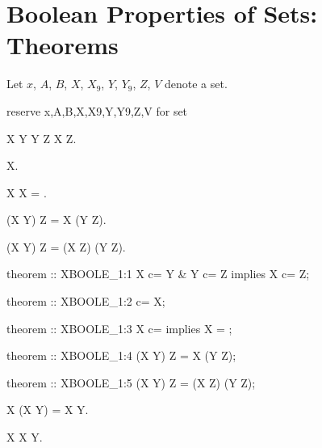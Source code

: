 \bigbreak
\section{Boolean Properties of Sets: Theorems}
\bigbreak

\begin{paracol}{2}
Let $x$, $A$, $B$, $X$, $X_{9}$, $Y$, $Y_{9}$, $Z$, $V$ denote a set.

\switchcolumn

\begin{mizar}
reserve x,A,B,X,X9,Y,Y9,Z,V for set
\end{mizar}

\switchcolumn*\ensurevspace{5cm}

\begin{theorem}
  X \subset Y \land Y \subset Z \implies X \subset Z.
\end{theorem}

\begin{theorem}
  \emptyset \subset X.
\end{theorem}

\begin{theorem}
  X \subset \emptyset \implies X = \emptyset.
\end{theorem}

\begin{theorem}
  (X \cup Y) \cup Z = X \cup (Y \cup Z).
\end{theorem}

\begin{theorem}
  (X \cup Y) \cup Z = (X \cup Z) \cup (Y \cup Z).
\end{theorem}

\switchcolumn

\begin{mizar}
theorem :: XBOOLE_1:1
  X c= Y & Y c= Z implies X c= Z;

theorem :: XBOOLE_1:2
  {} c= X;

theorem :: XBOOLE_1:3
  X c= {} implies X = {};

theorem :: XBOOLE_1:4
  (X \/ Y) \/ Z = X \/ (Y \/ Z);

theorem :: XBOOLE_1:5
  (X \/ Y) \/ Z = (X \/ Z) \/ (Y \/ Z);
\end{mizar}

\switchcolumn*\ensurevspace{5cm}

\begin{theorem}
  X \cup (X \cup Y) = X \cup Y.
\end{theorem}

\begin{theorem}
  X \subset X \cup Y.
\end{theorem}


\end{paracol}
